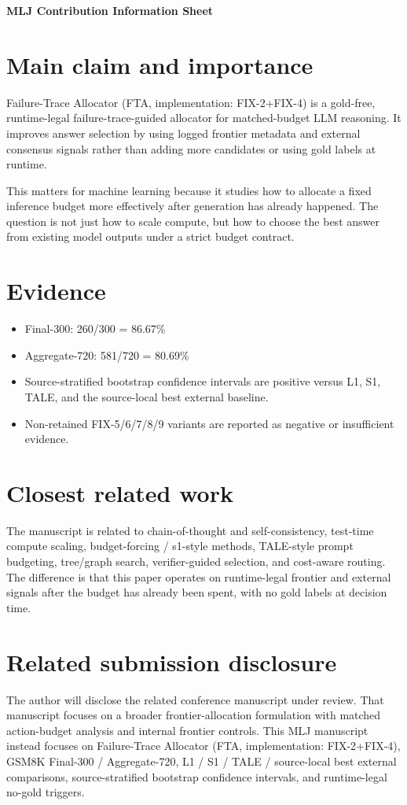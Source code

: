 \documentclass[11pt]{article}
\begin{document}
\begin{center}
{\Large \textbf{MLJ Contribution Information Sheet}}\\[4pt]
\end{center}

\section*{Main claim and importance}
Failure-Trace Allocator (FTA, implementation: FIX-2+FIX-4) is a gold-free, runtime-legal failure-trace-guided allocator for matched-budget LLM reasoning. It improves answer selection by using logged frontier metadata and external consensus signals rather than adding more candidates or using gold labels at runtime.

This matters for machine learning because it studies how to allocate a fixed inference budget more effectively after generation has already happened. The question is not just how to scale compute, but how to choose the best answer from existing model outputs under a strict budget contract.

\section*{Evidence}
\begin{itemize}[leftmargin=*]
  \item Final-300: 260/300 = 86.67\%
  \item Aggregate-720: 581/720 = 80.69\%
  \item Source-stratified bootstrap confidence intervals are positive versus L1, S1, TALE, and the source-local best external baseline.
  \item Non-retained FIX-5/6/7/8/9 variants are reported as negative or insufficient evidence.
\end{itemize}

\section*{Closest related work}
The manuscript is related to chain-of-thought and self-consistency, test-time compute scaling, budget-forcing / s1-style methods, TALE-style prompt budgeting, tree/graph search, verifier-guided selection, and cost-aware routing. The difference is that this paper operates on runtime-legal frontier and external signals after the budget has already been spent, with no gold labels at decision time.

\section*{Related submission disclosure}
The author will disclose the related conference manuscript under review. That manuscript focuses on a broader frontier-allocation formulation with matched action-budget analysis and internal frontier controls. This MLJ manuscript instead focuses on Failure-Trace Allocator (FTA, implementation: FIX-2+FIX-4), GSM8K Final-300 / Aggregate-720, L1 / S1 / TALE / source-local best external comparisons, source-stratified bootstrap confidence intervals, and runtime-legal no-gold triggers.
\end{document}
